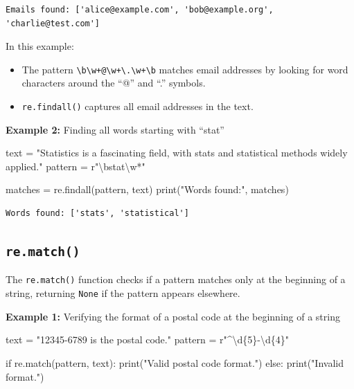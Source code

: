 \documentclass[
  letterpaper,
  DIV=11,
  numbers=noendperiod]{scrreprt}
\newenvironment{Shaded}{\begin{snugshade}}{\end{snugshade}}
\newcommand{\BuiltInTok}[1]{\textcolor[rgb]{0.00,0.23,0.31}{#1}}
\newcommand{\ControlFlowTok}[1]{\textcolor[rgb]{0.00,0.23,0.31}{#1}}
\newcommand{\NormalTok}[1]{\textcolor[rgb]{0.00,0.23,0.31}{#1}}
\newcommand{\OperatorTok}[1]{\textcolor[rgb]{0.37,0.37,0.37}{#1}}
\newcommand{\SpecialCharTok}[1]{\textcolor[rgb]{0.37,0.37,0.37}{#1}}
\newcommand{\StringTok}[1]{\textcolor[rgb]{0.13,0.47,0.30}{#1}}
\newcommand{\VerbatimStringTok}[1]{\textcolor[rgb]{0.13,0.47,0.30}{#1}}
\providecommand{\tightlist}{%
  \setlength{\itemsep}{0pt}\setlength{\parskip}{0pt}}\usepackage{longtable,booktabs,array}
\begin{document}
\begin{verbatim}
Emails found: ['alice@example.com', 'bob@example.org', 'charlie@test.com']
\end{verbatim}

In this example:

\begin{itemize}
\tightlist
\item
  The pattern
  \texttt{\textbackslash{}b\textbackslash{}w+@\textbackslash{}w+\textbackslash{}.\textbackslash{}w+\textbackslash{}b}
  matches email addresses by looking for word characters around the
  ``@'' and ``.'' symbols.
\item
  \texttt{re.findall()} captures all email addresses in the text.
\end{itemize}

\textbf{Example 2:} Finding all words starting with ``stat''

\begin{Shaded}
\begin{Highlighting}[]
\NormalTok{text }\OperatorTok{=} \StringTok{"Statistics is a fascinating field, with stats and statistical methods widely applied."}
\NormalTok{pattern }\OperatorTok{=} \VerbatimStringTok{r"\textbackslash{}bstat\textbackslash{}w*"}

\NormalTok{matches }\OperatorTok{=}\NormalTok{ re.findall(pattern, text)}
\BuiltInTok{print}\NormalTok{(}\StringTok{"Words found:"}\NormalTok{, matches)  }
\end{Highlighting}
\end{Shaded}

\begin{verbatim}
Words found: ['stats', 'statistical']
\end{verbatim}

\hypertarget{re.match}{%
\subsection{\texorpdfstring{\texttt{re.match()}}{re.match()}}\label{re.match}}

The \texttt{re.match()} function checks if a pattern matches only at the
beginning of a string, returning \texttt{None} if the pattern appears
elsewhere.

\textbf{Example 1:} Verifying the format of a postal code at the
beginning of a string

\begin{Shaded}
\begin{Highlighting}[]
\NormalTok{text }\OperatorTok{=} \StringTok{"12345{-}6789 is the postal code."}
\NormalTok{pattern }\OperatorTok{=} \VerbatimStringTok{r"\^{}\textbackslash{}d}\SpecialCharTok{\{5\}}\VerbatimStringTok{{-}\textbackslash{}d}\SpecialCharTok{\{4\}}\VerbatimStringTok{"}

\ControlFlowTok{if}\NormalTok{ re.match(pattern, text):}
    \BuiltInTok{print}\NormalTok{(}\StringTok{"Valid postal code format."}\NormalTok{)  }
\ControlFlowTok{else}\NormalTok{:}
    \BuiltInTok{print}\NormalTok{(}\StringTok{"Invalid format."}\NormalTok{)}
\end{Highlighting}
\end{Shaded}
\end{document}
